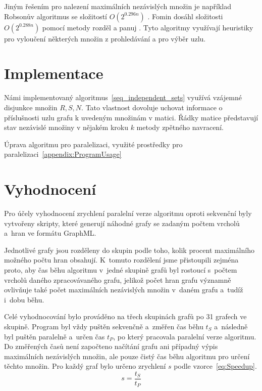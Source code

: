 \documentclass[12pt]{article}
\begin{document}
Jiným řešením pro nalezení maximálních nezávislých množin je například Robsonův algoritmus se složitostí \(O(2^{0.296n})\) \cite{robson}. Fomin dosáhl složitosti \(O(2^{0.288n})\) pomocí metody rozděl a panuj \cite{fomin}. Tyto algoritmy využívají heuristiky pro vyloučení některých množin z prohledávání a pro výběr uzlu.  

\section{Implementace}

Námi implementovaný algoritmus~\ref{seq_independent_sets} využívá vzájemné disjunkce množin $R,S,N$. Tato vlastnost dovoluje uchovat informace o příslušnosti uzlu grafu k uvedeným množinám v matici. Řádky matice představují stav nezávislé množiny v nějakém kroku $k$ metody zpětného navracení. 
                                                           
Úprava algoritmu pro paralelizaci, využité prostředky pro paralelizaci~\ref{appendix:ProgramUsage}


\section{Vyhodnocení}
Pro účely vyhodnocení zrychlení paralelní verze algoritmu oproti sekvenční byly vytvořeny skripty, které generují náhodné grafy se zadaným počtem vrcholů a~hran ve formátu GraphML. 

Jednotlivé grafy jsou rozděleny do skupin podle toho, kolik procent maximálního možného počtu hran obsahují. K~tomuto rozdělení jsme přistoupili zejména proto, aby čas běhu algoritmu v~jedné skupině grafů byl rostoucí s~počtem vrcholů daného zpracovávaného grafu, jelikož počet hran grafu významně ovlivňuje také počet maximálních nezávislých množin v~daném grafu a~tudíž i~dobu běhu. 

Celé vyhodnocování bylo prováděno na třech skupinách grafů po 31 grafech ve skupině. Program byl vždy puštěn sekvenčně a~změřen čas běhu $t_S$ a~následně byl puštěn paralelně a~určen čas $t_P$, po který pracovala paralelní verze algoritmu. Do změřených časů není započteno načítání grafu ani případný výpis maximálních nezávislých množin, ale pouze čistý čas běhu algoritmu pro určení těchto množin. Pro každý graf bylo určeno zrychlení $s$ podle vzorce~\ref{eq:Speedup}.
\begin{equation}
    s = \frac{t_S}{t_P} \label{eq:Speedup}
\end{equation}
\end{document}
